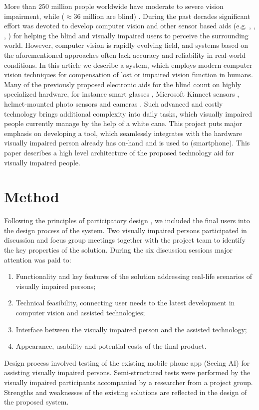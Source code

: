 \documentclass[10pt,conference,compsocconf]{IEEEtran}
\begin{document}
More than $250$ million people worldwide have moderate to severe vision impairment, while ($\approx 36$ million are blind) \cite{Bourne}. During the past decades significant effort was devoted to develop computer vision and other sensor based aids (e.g. \cite{Caraiman}, \cite{Csapo}, \cite{Poggi}, \cite{Zientara}) for helping the blind and visually impaired users to perceive the surrounding world. However, computer vision is rapidly evolving field, and systems based on the aforementioned approaches often lack accuracy and reliability in real-world conditions. In this article we describe a system, which employs modern computer vision techniques for compensation of lost or impaired vision function in humans. Many of the previously proposed electronic aids for the blind count on highly specialized hardware, for instance smart glasses \cite{Zientara}, Microsoft Kinnect sensors \cite{Owayjan}, helmet-mounted photo sensors and cameras \cite{Larisa}. Such advanced and costly technology brings additional complexity into daily tasks, which visually impaired people currently manage by the help of a white cane. This project puts major emphasis on developing a tool, which seamlessly integrates with the hardware visually impaired person already has on-hand and is used to (smartphone). This paper describes a high level architecture of the proposed technology aid for visually impaired people. 


\section{Method}
\label{sec:method}

Following the principles of participatory design \cite{Kensing}, \cite{Carroll} we included the final users into the design process of the system. Two visually impaired persons participated in discussion and focus group meetings together with the project team to identify the key properties of the solution. During the six discussion sessions major attention was paid to:
\begin{enumerate}
\item Functionality and key features of the solution addressing real-life scenarios of visually impaired persons;
\item Technical feasibility, connecting user needs to the latest development in computer vision and assisted technologies;
\item Interface between the visually impaired person and the assisted technology;
\item Appearance, usability and potential costs of the final product. 
\end{enumerate}
Design process involved testing of the existing mobile phone app (Seeing AI) for assisting visually impaired persons. Semi-structured tests were performed by the visually impaired participants accompanied by a researcher from a project group. Strengths and weaknesses of the existing solutions are reflected in the design of the proposed system. 
\end{document}
